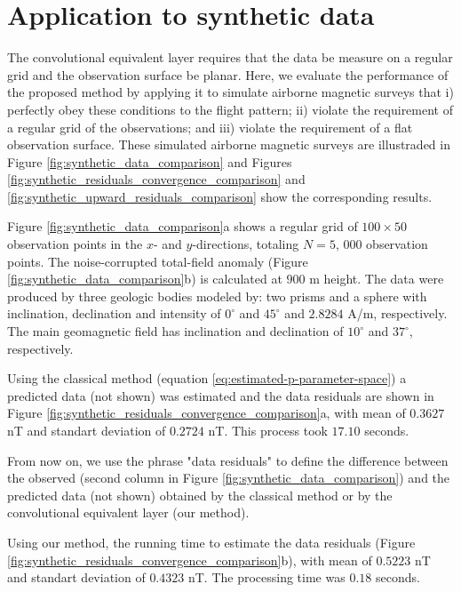 \section{Application to synthetic data}

The convolutional equivalent layer requires that the data be measure on a regular grid and the observation surface be planar.
Here, we evaluate the performance of the proposed method by applying it to simulate airborne magnetic surveys 
that i) perfectly obey these conditions to the flight pattern; ii) violate the requirement of a regular grid of the observations; and iii) violate the requirement of a flat observation surface.
These simulated airborne magnetic surveys are illustraded in Figure \ref{fig:synthetic_data_comparison} 
and Figures  \ref{fig:synthetic_residuals_convergence_comparison} and  \ref{fig:synthetic_upward_residuals_comparison} show the corresponding results.

Figure \ref{fig:synthetic_data_comparison}a shows a regular grid of  $100 \times 50$ observation points in the $x$- and $y$-directions, totaling  $N = 5,\, 000$ observation points. 
The noise-corrupted total-field anomaly (Figure \ref{fig:synthetic_data_comparison}b) is calculated at $900$ m height.
The data were produced by three geologic bodies modeled by: two prisms and a sphere with inclination, declination and intensity of $0^{\circ}$ and $45^{\circ}$ and $2.8284$ A/m, respectively. 
The main geomagnetic field has inclination and declination of $10^{\circ}$ and $37^{\circ}$, respectively. 

Using the classical method (equation \ref{eq:estimated-p-parameter-space}) a predicted data
(not shown) was estimated and the data residuals are shown in Figure \ref{fig:synthetic_residuals_convergence_comparison}a, 
with mean of $0.3627$ nT and standart deviation of $0.2724$ nT.
This process took $17.10$ seconds.

From now on, we use the phrase "data residuals" to define the difference between the observed (second column in Figure \ref{fig:synthetic_data_comparison}) and the predicted data (not shown) obtained by the classical method or by the convolutional equivalent layer (our method). 


Using our method, the running time to estimate the data residuals (Figure \ref{fig:synthetic_residuals_convergence_comparison}b), with mean of $0.5223$ nT and standart deviation of $0.4323$ nT. The processing time was $0.18$ seconds.

